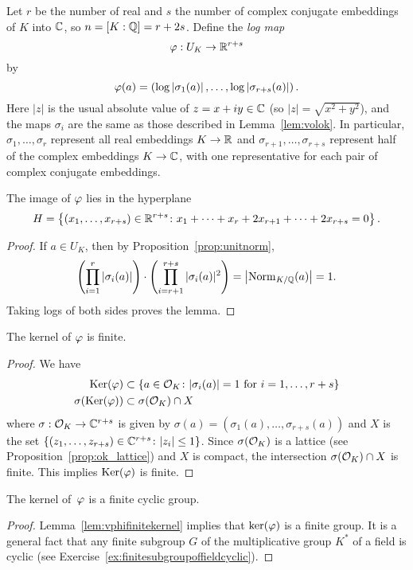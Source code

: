 Let $r$ be the number of real and $s$ the number of complex conjugate
embeddings of $K$ into $\mathbb{C}$, so $n=[K:\mathbb{Q}]=r+2s$.
Define the {\em log map}
$$
	\varphi:U_K \to \mathbb{R}^{r+s}
$$
by
$$
	\varphi(a) = \left(
	\log\left|\sigma_1(a)\right|, \ldots, \log\left|\sigma_{r+s}(a)\right|
	\right).
$$
Here $|z|$ is the usual absolute value of $z=x+iy\in\mathbb{C}$
(so $|z|=\sqrt{x^2+y^2}$), and the maps $\sigma_i$ are
the same as those described in Lemma~\ref{lem:volok}.
In particular,
$\sigma_1,\dots,\sigma_r$ represent all real embeddings
$K\to\mathbb{R}$ and $\sigma_{r+1},\dots,\sigma_{r+s}$ represent
half of the complex embeddings $K\to\mathbb{C}$, with one representative
for each pair of complex conjugate embeddings.

\begin{lemma}\label{lem:inh}
	The image of $\varphi$ lies in the hyperplane
\begin{equation}\label{eqn:hyperplane}
	H = \left\{ (x_1,\ldots, x_{r+s})\in\mathbb{R}^{r+s} \colon
	x_1+ \cdots + x_r + 2x_{r+1} + \cdots + 2x_{r+s} = 0 \right\}.
\end{equation}
\end{lemma}
\begin{proof}
	If $a\in U_K$, then by Proposition~\ref{prop:unitnorm},
	$$
		\left(\prod_{i=1}^{r} |\sigma_i(a)|\right)
		\cdot \left( \prod_{i=r+1}^{r+s} |\sigma_i(a)|^2 \right)
		= \left|\operatorname{Norm}_{K/\mathbb{Q}}(a)\right|
		= 1.
	$$
	Taking logs of both sides proves the lemma.
\end{proof}

\begin{lemma}\label{lem:vphifinitekernel}
	The kernel of $\varphi$ is finite.
\end{lemma}
\begin{proof}
	We have
	\begin{align*}
		\operatorname{Ker}(\varphi) &\subset \left\{a\in\mathcal{O}_K \colon |\sigma_i(a)|
		= 1 \text{ for }i=1,\ldots,r+s\right\} \\
		\sigma(\operatorname{Ker}(\varphi)) &\subset \sigma(\mathcal{O}_K) \cap X
	\end{align*}
	where $\sigma:\mathcal{O}_K \to \mathbb{C}^{r+s}$ is given by
	$\sigma(a) = \left(\sigma_1(a),\dots,\sigma_{r+s}(a)\right)$ and
	$X$ is the set $\left\{(z_1,\dots,z_{r+s})\in\mathbb{C}^{r+s} \colon |z_i|\leq 1\right\}$.
	Since $\sigma(\mathcal{O}_K)$ is a lattice (see Proposition~\ref{prop:ok_lattice}) and $X$
	is compact, the intersection $\sigma(\mathcal{O}_K)\cap X$ is finite.
	This implies $\operatorname{Ker}(\varphi)$ is finite.
\end{proof}

\begin{lemma}\label{lem:kerfcg}
	The kernel of~$\varphi$ is a finite cyclic group.
\end{lemma}
\begin{proof}
	Lemma~\ref{lem:vphifinitekernel} implies that $\ker(\varphi)$ is a
	finite group.  It is a general fact that any finite subgroup $G$ of
	the multiplicative group $K^*$ of a field is cyclic (see
	Exercise~\ref{ex:finitesubgroupoffieldcyclic}).
\end{proof}

